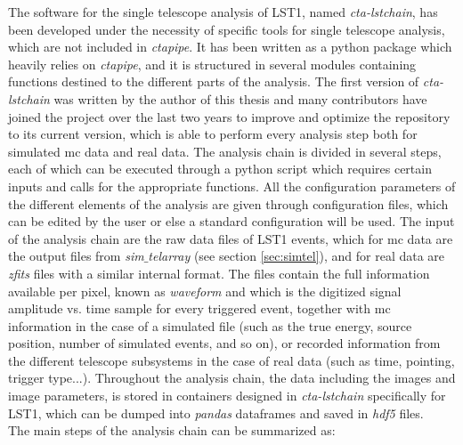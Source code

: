 \documentclass[main.tex]{subfiles}
\begin{document}
The software for the single telescope analysis of LST1, named \textit{cta-lstchain}, has been developed under the necessity of specific tools for single telescope analysis, which are not included in \textit{ctapipe}. It has been written as a python package which heavily relies on \textit{ctapipe}, and it is structured in several modules containing functions destined to the different parts of the analysis. The first version of \textit{cta-lstchain} was written by the author of this thesis and many contributors have joined the project over the last two years to improve and optimize the repository to its current version, which is able to perform every analysis step both for simulated \gls{mc} data and real data. The analysis chain is divided in several steps, each of which can be executed through a python script which requires certain inputs and calls for the appropriate functions. All the configuration parameters of the different elements of the analysis are given through configuration files, which can be edited by the user or else a standard configuration will be used. The input of the analysis chain are the raw data files of LST1 events, which for \gls{mc} data are the output files from \textit{sim$\_$telarray} (see section \ref{sec:simtel}), and for real data are \textit{zfits} files with a similar internal format. The files contain the full information available per pixel, known as \textit{waveform} and which is the digitized signal amplitude vs. time sample for every triggered event, together with \gls{mc} information in the case of a simulated file (such as the true energy, source position, number of simulated events, and so on), or recorded information from the different telescope subsystems in the case of real data (such as time, pointing, trigger type...). Throughout the analysis chain, the data including the images and image parameters, is stored in containers designed in \textit{cta-lstchain} specifically for LST1, which can be dumped into \textit{pandas} dataframes and saved in \textit{hdf5} files.\\
The main steps of the analysis chain can be summarized as: \\
\end{document}
